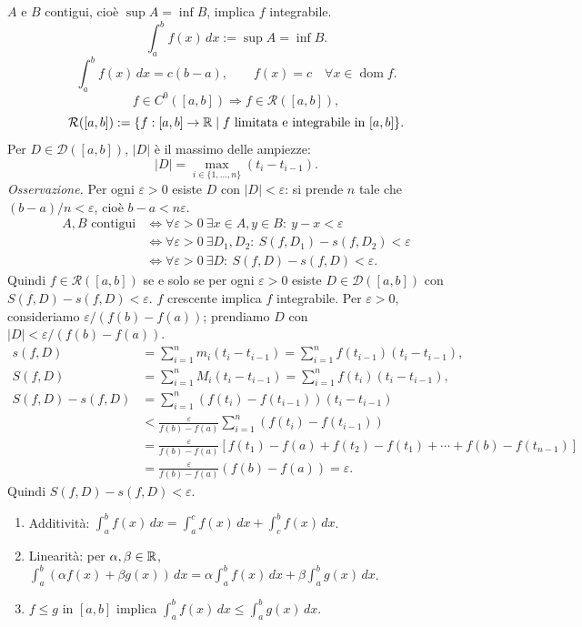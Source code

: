 $A$ e $B$ contigui, cioè $\sup A=\inf B$, implica $f$ integrabile.
\[\int_a^b f(x)\,dx:=\sup A=\inf B.\]
\[\int_a^b f(x)\,dx=c(b-a),\qquad f(x)=c\quad\forall x\in\operatorname{dom}f.\]
\[f\in C^0([a,b])\Longrightarrow f\in\mathcal R([a,b]),\]
\[\mathcal R([a,b]):=\{f:[a,b]\to\mathbb R\mid f\text{ limitata e integrabile in }[a,b]\}.\]
Per $D\in\mathcal D([a,b])$, $|D|$ è il massimo delle ampiezze:
\[|D|=\max_{i\in\{1,\ldots,n\}}(t_i-t_{i-1}).\]
\textit{Osservazione.} Per ogni $\varepsilon>0$ esiste $D$ con $|D|<\varepsilon$: si prende $n$ tale che $(b-a)/n<\varepsilon$, cioè $b-a<n\varepsilon$.
\begin{align*}
A,B\text{ contigui}&\iff\forall\varepsilon>0\ \exists x\in A,y\in B:\ y-x<\varepsilon\\
&\iff\forall\varepsilon>0\ \exists D_1,D_2:\ S(f,D_1)-s(f,D_2)<\varepsilon\\
&\iff\forall\varepsilon>0\ \exists D:\ S(f,D)-s(f,D)<\varepsilon.
\end{align*}
Quindi $f\in\mathcal R([a,b])$ se e solo se per ogni $\varepsilon>0$ esiste $D\in\mathcal D([a,b])$ con $S(f,D)-s(f,D)<\varepsilon$.
$f$ crescente implica $f$ integrabile.
Per $\varepsilon>0$, consideriamo $\varepsilon/(f(b)-f(a))$; prendiamo $D$ con $|D|<\varepsilon/(f(b)-f(a))$.
\begin{align*}
s(f,D)&=\sum_{i=1}^n m_i(t_i-t_{i-1})=\sum_{i=1}^n f(t_{i-1})(t_i-t_{i-1}),\\
S(f,D)&=\sum_{i=1}^n M_i(t_i-t_{i-1})=\sum_{i=1}^n f(t_i)(t_i-t_{i-1}),\\
S(f,D)-s(f,D)&=\sum_{i=1}^n(f(t_i)-f(t_{i-1}))(t_i-t_{i-1})\\
&<\frac\varepsilon{f(b)-f(a)}\sum_{i=1}^n(f(t_i)-f(t_{i-1}))\\
&=\frac\varepsilon{f(b)-f(a)}[f(t_1)-f(a)+f(t_2)-f(t_1)+\cdots+f(b)-f(t_{n-1})]\\
&=\frac\varepsilon{f(b)-f(a)}(f(b)-f(a))=\varepsilon.
\end{align*}
Quindi $S(f,D)-s(f,D)<\varepsilon$.
\begin{enumerate}\item Additività: $\displaystyle\int_a^b f(x)\,dx=\int_a^c f(x)\,dx+\int_c^b f(x)\,dx$.
\item Linearità: per $\alpha,\beta\in\mathbb R$, $\displaystyle\int_a^b(\alpha f(x)+\beta g(x))\,dx=\alpha\int_a^b f(x)\,dx+\beta\int_a^b g(x)\,dx$.
\item $f\le g$ in $[a,b]$ implica $\displaystyle\int_a^b f(x)\,dx\le\int_a^b g(x)\,dx$.\end{enumerate}
